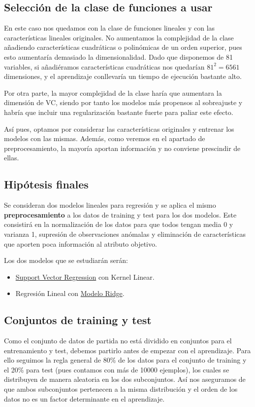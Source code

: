 \documentclass[a4]{article}
\begin{document}
\subsection{Selección de la clase de funciones a usar}

En este caso nos quedamos con la clase de funciones lineales y con las características lineales originales. No aumentamos la complejidad de la clase añadiendo características cuadráticas o polinómicas de un orden superior, pues esto aumentaría demasiado la dimensionalidad. Dado que disponemos de 81 variables, si añadiéramos características cuadráticas nos quedarían $81^2=6561$ dimensiones, y el aprendizaje conllevaría un tiempo de ejecución bastante alto.  

Por otra parte, la mayor complejidad de la clase haría que aumentara la dimensión de VC, siendo por tanto los modelos más propensos al sobreajuste y habría que incluir una regularización bastante fuerte para paliar este efecto. 

Así pues, optamos por considerar las características originales y entrenar los modelos con las mismas. Además, como veremos en el apartado de preprocesamiento, la mayoría aportan información y no conviene prescindir de ellas. 

\subsection{Hipótesis finales}

Se consideran dos modelos lineales para regresión y se aplica el mismo \textbf{preprocesamiento} a los datos de training y test para los dos modelos. Este consistirá en la normalización de los datos para que todos tengan media 0 y varianza 1, supresión de observaciones anómalas y eliminación de características que aporten poca información al atributo objetivo.

Los dos modelos que se estudiarán serán:
\begin{itemize}
	\item \underline{Support Vector Regression} con Kernel Linear. 
	\item Regresión Lineal con \underline{Modelo Ridge}. 
\end{itemize}

\subsection{Conjuntos de training y test}
Como el conjunto de datos de partida no está dividido en conjuntos para el entrenamiento y test, debemos partirlo antes de empezar con el aprendizaje. Para ello seguimos la regla general de 80\% de los datos para el conjunto de training y el 20\% para test (pues contamos con más de 10000 ejemplos), los cuales se distribuyen de manera aleatoria en los dos subconjuntos. Así nos aseguramos de que ambos subconjuntos pertenecen a la misma distribución y el orden de los datos no es un factor determinante en el aprendizaje. 
\end{document}
